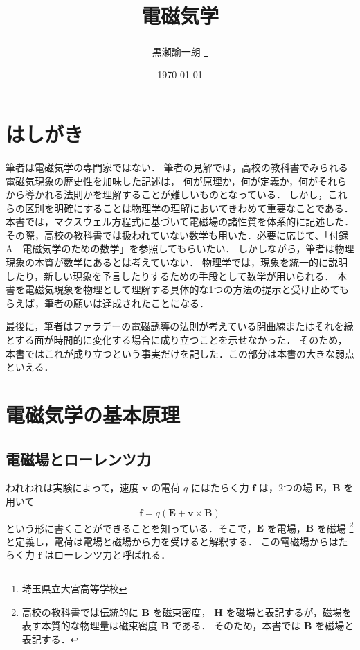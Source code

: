 \documentclass[11pt, a4paper]{ltjsarticle}
\title{電磁気学}
\author{黒瀬諭一朗 \thanks{埼玉県立大宮高等学校}}
\date{\today}
\numberwithin{equation}{section}
\begin{document}
\maketitle
\tableofcontents

\section*{はしがき}
筆者は電磁気学の専門家ではない．
筆者の見解では，高校の教科書でみられる電磁気現象の歴史性を加味した記述は，
何が原理か，何が定義か，何がそれらから導かれる法則かを理解することが難しいものとなっている．
しかし，これらの区別を明確にすることは物理学の理解においてきわめて重要なことである．
本書では，マクスウェル方程式に基づいて電磁場の諸性質を体系的に記述した．
その際，高校の教科書では扱われていない数学も用いた．必要に応じて、「付録A　電磁気学のための数学」を参照してもらいたい．
しかしながら，筆者は物理現象の本質が数学にあるとは考えていない．
物理学では，現象を統一的に説明したり，新しい現象を予言したりするための手段として数学が用いられる．
本書を電磁気現象を物理として理解する具体的な1つの方法の提示と受け止めてもらえば，筆者の願いは達成されたことになる．

最後に，筆者はファラデーの電磁誘導の法則が考えている閉曲線またはそれを縁とする面が時間的に変化する場合に成り立つことを示せなかった．
そのため，本書ではこれが成り立つという事実だけを記した．この部分は本書の大きな弱点といえる．

\section{電磁気学の基本原理}
\subsection{電磁場とローレンツ力}
われわれは実験によって，速度 $\bm{v}$ の電荷 $q$ にはたらく力 $\bm{f}$ は，2つの場 $\bm{E}$，$\bm{B}$ を用いて
\[
  \bm{f} = q \left( \bm{E} + \bm{v} \times \bm{B} \right)
\]
という形に書くことができることを知っている．そこで，$\bm{E}$ を電場，$\bm{B}$ を磁場
\footnote{高校の教科書では伝統的に $\bm{B}$ を磁束密度， $\bm{H}$ を磁場と表記するが，磁場を表す本質的な物理量は磁束密度 $\bm{B}$ である．
そのため，本書では $\bm{B}$ を磁場と表記する．}
と定義し，電荷は電場と磁場から力を受けると解釈する．
この電磁場からはたらく力 $\bm{f}$ はローレンツ力と呼ばれる．
\end{document}
